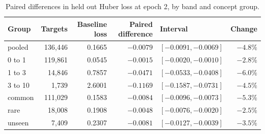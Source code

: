 \begin{table}[!htbp]
\caption{Paired differences in held out Huber loss at epoch 2, by band and concept group.}
\label{tab:endpoints}
\small
\begin{tabular}{lrrrlr}
\toprule
Group & Targets & Baseline loss & Paired difference & Interval & Change \\
\midrule
pooled & 136,446 & 0.1665 & $-0.0079$ & $[-0.0091, -0.0069]$ & $-4.8\%$ \\
0 to 1 & 119,861 & 0.0545 & $-0.0015$ & $[-0.0020, -0.0010]$ & $-2.8\%$ \\
1 to 3 & 14,846 & 0.7857 & $-0.0471$ & $[-0.0533, -0.0408]$ & $-6.0\%$ \\
3 to 10 & 1,739 & 2.6001 & $-0.1169$ & $[-0.1587, -0.0731]$ & $-4.5\%$ \\
common & 111,029 & 0.1583 & $-0.0084$ & $[-0.0096, -0.0073]$ & $-5.3\%$ \\
rare & 18,008 & 0.1908 & $-0.0048$ & $[-0.0076, -0.0020]$ & $-2.5\%$ \\
unseen & 7,409 & 0.2307 & $-0.0081$ & $[-0.0127, -0.0039]$ & $-3.5\%$ \\
\bottomrule
\end{tabular}
\end{table}